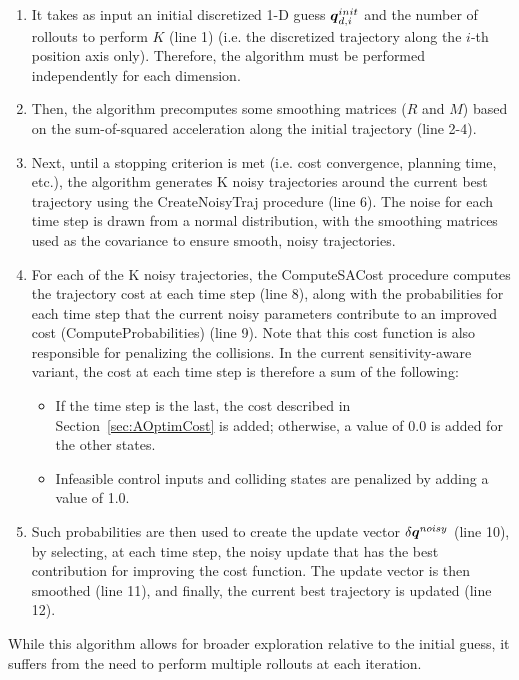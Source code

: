 \begin{enumerate}
    \item It takes as input an initial discretized 1-D guess $\boldsymbol{q}_{d,i}^{init}$ and the number of rollouts to perform $K$ (line 1) (i.e. the discretized trajectory along the $i$-th position axis only). 
    Therefore, the algorithm must be performed independently for each dimension. 
    \item Then, the algorithm precomputes some smoothing matrices ($R$ and $M$) based on the sum-of-squared acceleration along the initial trajectory (line 2-4).
    \item Next, until a stopping criterion is met (i.e. cost convergence, planning time, etc.), the algorithm generates K noisy trajectories around the current best trajectory using the CreateNoisyTraj procedure (line 6).
    The noise for each time step is drawn from a normal distribution, with the smoothing matrices used as the covariance to ensure smooth, noisy trajectories.
    \item For each of the K noisy trajectories, the ComputeSACost procedure computes the trajectory cost at each time step (line 8), along with the probabilities for each time step that the current noisy parameters contribute to an improved cost (ComputeProbabilities) (line 9).
    Note that this cost function is also responsible for penalizing the collisions.
    In the current sensitivity-aware variant, the cost at each time step is therefore a sum of the following:
    \begin{itemize}
        \item If the time step is the last, the cost described in Section~\ref{sec:AOptimCost} is added; otherwise, a value of 0.0 is added for the other states.
        \item Infeasible control inputs and colliding states are penalized by adding a value of 1.0.
    \end{itemize}
    \item Such probabilities are then used to create the update vector $\delta \boldsymbol{q}^{noisy}$ (line 10), by selecting, at each time step, the noisy update that has the best contribution for improving the cost function.
    The update vector is then smoothed (line 11), and finally, the current best trajectory is updated (line 12).
\end{enumerate}

While this algorithm allows for broader exploration relative to the initial guess, it suffers from the need to perform multiple rollouts at each iteration.

